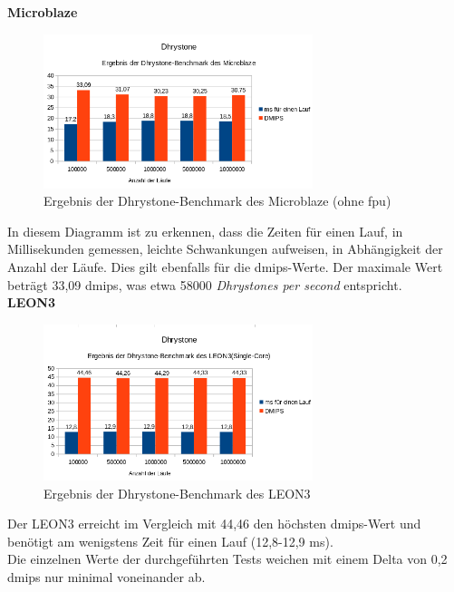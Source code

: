 \textbf{Microblaze}

\begin{figure}[H]
\centering
\includegraphics[width=0.7\textwidth]{Hauptteil/dhrystonembohnefpu.png}
\caption{Ergebnis der Dhrystone-Benchmark des Microblaze (ohne \ac{fpu})}
\label{fig:dhrystonembohnefpu}
\end{figure}

In diesem Diagramm ist zu erkennen, dass die Zeiten für einen Lauf, in Millisekunden gemessen, leichte Schwankungen aufweisen, in Abhängigkeit der Anzahl der Läufe. Dies gilt ebenfalls für
die \ac{dmips}-Werte. Der maximale Wert beträgt 33,09 \ac{dmips}, was etwa 58000 \emph{Dhrystones per second} entspricht.\\

\textbf{LEON3}

\begin{figure}[H]
\centering
\includegraphics[width=0.7\textwidth]{Hauptteil/dhrystonesingleleon3.png}
\caption{Ergebnis der Dhrystone-Benchmark des LEON3}
\label{fig:dhrystonesingleleon3}
\end{figure}

Der LEON3 erreicht im Vergleich mit 44,46 den höchsten \ac{dmips}-Wert und benötigt am wenigstens Zeit für einen Lauf (12,8-12,9 ms).\\ Die einzelnen Werte der durchgeführten Tests weichen mit
einem Delta von 0,2 \ac{dmips} nur minimal voneinander ab.\\

